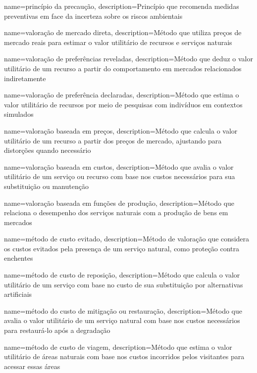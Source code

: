 {
	name=princípio da precaução,
	description={Princípio que recomenda medidas preventivas em face da incerteza sobre os riscos ambientais}
}

{
	name=valoração de mercado direta,
	description={Método que utiliza preços de mercado reais para estimar o valor utilitário de recursos e serviços naturais}
}

{
	name=valoração de preferências reveladas,
	description={Método que deduz o valor utilitário de um recurso a partir do comportamento em mercados relacionados indiretamente}
}

{
	name=valoração de preferência declaradas,
	description={Método que estima o valor utilitário de recursos por meio de pesquisas com indivíduos em contextos simulados}
}

{
	name=valoração baseada em preços,
	description={Método que calcula o valor utilitário de um recurso a partir dos preços de mercado, ajustando para distorções quando necessário}
}

{
	name=valoração baseada em custos,
	description={Método que avalia o valor utilitário de um serviço ou recurso com base nos custos necessários para sua substituição ou manutenção}
}

{
	name=valoração baseada em funções de produção,
	description={Método que relaciona o desempenho dos serviços naturais com a produção de bens em mercados}
}

{
	name=método de custo evitado,
	description={Método de valoração que considera os custos evitados pela presença de um serviço natural, como proteção contra enchentes}
}

{
	name=método de custo de reposição,
	description={Método que calcula o valor utilitário de um serviço com base no custo de sua substituição por alternativas artificiais}
}

{
	name=método do custo de mitigação ou restauração,
	description={Método que avalia o valor utilitário de um serviço natural com base nos custos necessários para restaurá-lo após a degradação}
}

{
	name=método de custo de viagem,
	description={Método que estima o valor utilitário de áreas naturais com base nos custos incorridos pelos visitantes para acessar essas áreas}
}

